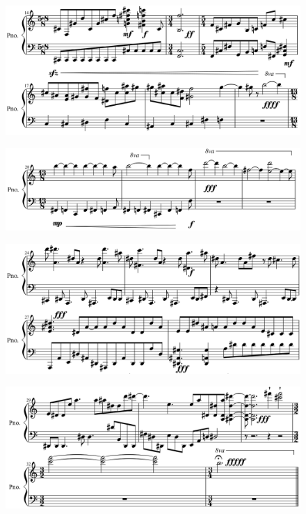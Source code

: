 \documentclass[
	12pt,				%
	openright,			%
	twoside,			%
	a4paper,			%
	english,			%
	french,				%
	spanish,			%
	brazil				%
	]{abntex2}
\begin{document}
\begin{figure}[!h]
	\begin{center}
	    \includegraphics*[scale=0.4]{score/epigrafe02.png}
	\end{center}
\end{figure}

\begin{figure}[!h]
	\begin{center}
	    \includegraphics*[scale=0.4]{score/epigrafe03.png}
	\end{center}
\end{figure}

\begin{figure}[!h]
	\begin{center}
	    \includegraphics*[scale=0.4]{score/epigrafe04.png}
	\end{center}
\end{figure}


\begin{figure}[!h]
	\begin{center}
	    \includegraphics*[scale=0.4]{score/epigrafe05.png}
	\end{center}
\end{figure}
\pagebreak
\end{document}
